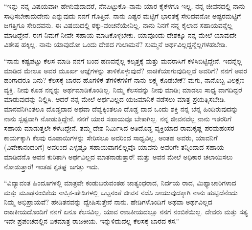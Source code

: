 “ಇನ್ನು ನನ್ನ ವಿಷಯವಾಗಿ ಹೇಳುವುದಾದರೆ, ನೆನಪಿಟ್ಟುಕೊ–ನಾನು ಯಾರ ಕೈಕೆಳಗೂ ಇಲ್ಲ. ನನ್ನ ಜೀವನದಲ್ಲಿ ನಾನು ಸಾಧಿಸಬೇಕಾದುದೇನು ಎನ್ನುವುದು ನನಗೆ ಗೊತ್ತಿದೆ. ನಾನು ಎಷ್ಟರ ಮಟ್ಟಿಗೆ ಭಾರತಕ್ಕೆ ಸೇರಿದವನೋ ಅಷ್ಟರಮಟ್ಟಿಗೆ ಜಗತ್ತಿಗೂ ಸೇರಿದವನು. ಈ ವಿಷಯದಲ್ಲಿ ಠಕ್ಕು-ವಂಚನೆಯೇನಿಲ್ಲ. ನಾನು ನಿನಗೆ ನನ್ನ ಕೈಲಾದ ಸಹಾಯವನ್ನೆಲ್ಲ ಮಾಡಿದ್ದೇನೆ. ಈಗ ನಿಮಗೆ ನೀವೇ ಸಹಾಯ ಮಾಡಿಕೊಳ್ಳಬೇಕು. ಯಾವೊಂದು ದೇಶಕ್ಕೂ ನನ್ನ ಮೇಲೆ ಯಾವುದೇ ವಿಶೇಷ ಹಕ್ಕಿಲ್ಲ. ನಾನು ಯಾವುದೋ ಒಂದು ದೇಶದ ಗುಲಾಮನೆ? ಸುಮ್ಮನೆ ಅರ್ಥವಿಲ್ಲದ್ದನ್ನೆಲ್ಲಗಳಹಬೇಡಿ.

“ನಾನು ಕಷ್ಟಪಟ್ಟು ಕೆಲಸ ಮಾಡಿ ನನಗೆ ಬಂದ ಹಣವನ್ನೆಲ್ಲ ಕಲ್ಕತ್ತಕ್ಕೆ ಮತ್ತು ಮದರಾಸಿಗೆ ಕಳಿಸಿಬಿಟ್ಟಿದ್ದೇನೆ. ಇದನ್ನೆಲ್ಲ ಮಾಡಿದ ಮೇಲೂ ಅವರ ಮೂರ್ಖ ಆಜ್ಞೆಗಳನ್ನು ತಾಳಿಕೊಳ್ಳುವುದೆ? ನಾಚಿಕೆಯಾಗುವುದಿಲ್ಲವೆ ಅವರಿಗೆ? ನನಗೆ ಅವರ ಹಂಗಾದರೂ ಏನು? ಕೆಲಸಕ್ಕೆ ಬಾರದ ಹೊಗಳಿಕೆ-ತೆಗಳಿಕೆಗಳಿಗೆ ನಾನು ಲಕ್ಷ್ಯ ಕೊಡಬೇಕೆ? ಮಗು, ನಾನೊಬ್ಬ ವಿಲಕ್ಷಣ ವ್ಯಕ್ತಿ. ನೀವು ಕೂಡ ನನ್ನನ್ನು ಅರ್ಥಮಾಡಿಕೊಂಡಿಲ್ಲ. ನಿಮ್ಮ ಕೆಲಸವನ್ನು ನೀವು ಮಾಡಿ; ಮಾಡಲು ಸಾಧ್ಯ ವಾಗದಿದ್ದರೆ ಮಾಡುವುದನ್ನು ನಿಲ್ಲಿಸಿ. ಆದರೆ ನನ್ನ ಮೇಲೆ ಅರ್ಥವಿಲ್ಲದ ಯಜಮಾನಿಕೆ ನಡೆಸಲು ಮಾತ್ರ ಪ್ರಯತ್ನಿಸಬೇಡಿ. ಮಾನವನಿಗಿಂತಲೂ ದೊಡ್ಡದಾದ ಅಥವಾ ದೆವ್ವಕ್ಕಿಂತಲೂ ದೊಡ್ಡ ದಾದ ಒಂದು ಶಕ್ತಿ ನನ್ನ ಬೆನ್ನ ಹಿಂದಿರುವುದನ್ನು ನಾನು ಸ್ಪಷ್ಟವಾಗಿ ನೋಡುತ್ತಿದ್ದೇನೆ. ನನಗೆ ಯಾರ ಸಹಾಯವೂ ಬೇಕಾಗಿಲ್ಲ. ನನ್ನ ಜೀವನವೆಲ್ಲ ನಾನು ಇತರರಿಗೆ ಸಹಾಯ ಮಾಡುತ್ತಲೇ ಕಳೆದಿದ್ದೇನೆ. ತಮ್ಮ ದೇಶ ನಿರ್ಮಿಸಿದ ಅತಿದೊಡ್ಡ ವ್ಯಕ್ತಿಯಾದ ರಾಮಕೃಷ್ಣ ಪರಮಹಂಸರ ಕಾರ್ಯಕ್ಕಾಗಿ ಕೆಲವು ರೂಪಾಯಿಗಳನ್ನು ಸೇರಿಸಲೂ ಅವರಿಂದ ಸಾಧ್ಯವಿಲ್ಲ. ಅಂತಹ ಅವರು, ಯಾವನಿಗೆ (ವಿವೇಕಾನಂದರಿಗೆ) ಅವರಿಂದ ಎಳ್ಳಷ್ಟೂ ಸಹಾಯವಾಗಲಿಲ್ಲವೊ ಯಾವನು ಅವರಿಗೇ ತನ್ನಿಂದಾದ ಸಹಾಯ ಮಾಡಿದನೊ ಅವನ ಕುರಿತಾಗಿ ಅರ್ಥವಿಲ್ಲದ ಮಾತನಾಡುತ್ತಾರೆ! ಮತ್ತು ಅವನ ಮೇಲೆ ಅಧಿಕಾರ ಚಲಾಯಿಸಲು ನೋಡುತ್ತಾರೆ! ಇಂತಹ ಕೃತಘ್ನ ಜಗತ್ತು ಇದು.

“ವಿದ್ಯಾವಂತ ಹಿಂದೂಗಳಲ್ಲಿ ಮಾತ್ರವೇ ಕಂಡುಬರುವಂತಹ ಜಾತ್ಯಂಧರಾದ, ನಿರ್ದಯ ರಾದ, ಮಿಥ್ಯಾಚಾರಿಗಳಾದ ಮತ್ತು ಮೂಢನಂಬಿಕೆಯ ನಾಸ್ತಿಕ-ಹೇಡಿಗಳಲ್ಲಿ ಒಬ್ಬನಂತೆ ಜೀವನ ನಡೆಸಿ ಸಾಯುವುದಕ್ಕಾಗಿ ನಾನು ಹುಟ್ಟಿದೆನೆಂದು ನಿಮ್ಮ ಅಭಿಪ್ರಾಯವೆ? ಹೇಡಿತನವನ್ನು ದ್ವೇಷಿಸುತ್ತೇನೆ ನಾನು. ಹೇಡಿಗಳೊಂದಿಗೆ ಅಥವಾ ಅರ್ಥವಿಲ್ಲದ ರಾಜಕೀಯದೊಂದಿಗೆ ನನಗೆ ಏನೂ ಕೆಲಸವಿಲ್ಲ. ಯಾವ ರಾಜಕೀಯದಲ್ಲೂ ನನಗೆ ನಂಬಿಕೆಯಿಲ್ಲ. ದೇವರು ಮತ್ತು ಸತ್ಯ ಇವೇ ಪ್ರಪಂಚದಲ್ಲಿನ ಏಕಮಾತ್ರ ರಾಜಕೀಯ. ಇನ್ನುಳಿದುದೆಲ್ಲ ಕೆಲಸಕ್ಕೆ ಬಾರದ ಕಸ.”

